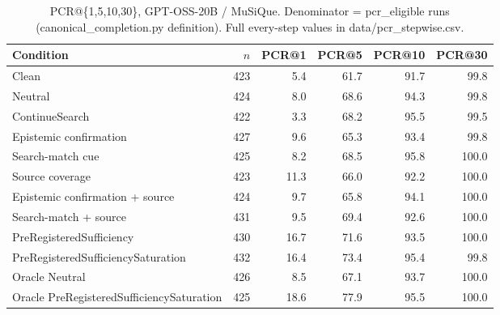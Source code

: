 \begin{table}[t]
\centering
\caption{PCR@\{1,5,10,30\}, GPT-OSS-20B / MuSiQue. Denominator = pcr\_eligible runs (canonical\_completion.py definition). Full every-step values in data/pcr_stepwise.csv.}
\begin{tabular}{lrrrrr}
\toprule
Condition & $n$ & PCR@1 & PCR@5 & PCR@10 & PCR@30 \\
\midrule
Clean & 423 & 5.4 & 61.7 & 91.7 & 99.8 \\
Neutral & 424 & 8.0 & 68.6 & 94.3 & 99.8 \\
ContinueSearch & 422 & 3.3 & 68.2 & 95.5 & 99.5 \\
Epistemic confirmation & 427 & 9.6 & 65.3 & 93.4 & 99.8 \\
Search-match cue & 425 & 8.2 & 68.5 & 95.8 & 100.0 \\
Source coverage & 423 & 11.3 & 66.0 & 92.2 & 100.0 \\
Epistemic confirmation + source & 424 & 9.7 & 65.8 & 94.1 & 100.0 \\
Search-match + source & 431 & 9.5 & 69.4 & 92.6 & 100.0 \\
PreRegisteredSufficiency & 430 & 16.7 & 71.6 & 93.5 & 100.0 \\
PreRegisteredSufficiencySaturation & 432 & 16.4 & 73.4 & 95.4 & 99.8 \\
Oracle Neutral & 426 & 8.5 & 67.1 & 93.7 & 100.0 \\
Oracle PreRegisteredSufficiencySaturation & 425 & 18.6 & 77.9 & 95.5 & 100.0 \\
\bottomrule
\end{tabular}
\end{table}


